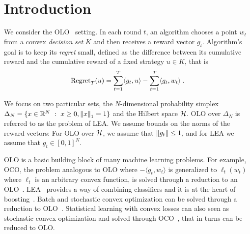 \section{Introduction}
\label{section:introduction}

We consider the \ac{OLO}~\cite{Cesa-Bianchi-Lugosi-2006, Shalev-Shwartz-2011}
setting. In each round $t$, an algorithm chooses a point $w_t$ from a convex
\emph{decision set} $K$ and then receives a reward vector $g_t$. Algorithm's
goal is to keep its \emph{regret} small, defined as the difference between its
cumulative reward and the cumulative reward of a fixed strategy $u \in K$, that
is
\[
\operatorname{Regret}_T(u) = \sum_{t=1}^T \langle g_t, u \rangle - \sum_{t=1}^T \langle g_t, w_t \rangle \; .
\]

We focus on two particular sets, the $N$-dimensional probability simplex
$\Delta_N = \{ x \in \mathbb{R}^N ~:~ x \ge 0, \left\|{x}\right\|_1 = 1\}$ and the Hilbert space
$\mathcal{H}$.  \ac{OLO} over $\Delta_N$ is referred to as the problem of \ac{LEA}.  We
assume bounds on the norms of the reward vectors: For \ac{OLO} over $\mathcal{H}$, we
assume that $\left\|{g_t}\right\| \le 1$, and for \ac{LEA} we assume that $g_t \in
[0,1]^N$.

\ac{OLO} is a basic building block of many machine learning problems. For
example, \ac{OCO}, the problem analogous to \ac{OLO} where $-\langle g_t, w_t
\rangle$ is generalized to $\ell_t(w_t)$ where $\ell_t$ is an arbitrary convex
function, is solved through a reduction to an
\ac{OLO}~\cite{Shalev-Shwartz-2011}.  \ac{LEA}~\cite{Littlestone-Warmuth-1994,
Vovk-1998, Cesa-Bianchi-Freund-Haussler-Helmbold-Schapire-Warmuth-1997}
provides a way of combining classifiers and it is at the heart of
boosting~\cite{Freund-Schapire-1997}. Batch and stochastic convex optimization
can be solved through a reduction to \ac{OLO}~\cite{Shalev-Shwartz-2011}.
Statistical learning with convex losses can also seen as stochastic convex
optimization and solved through \ac{OCO}~\cite{Munro-1951}, that in turns can
be reduced to \ac{OLO}.

